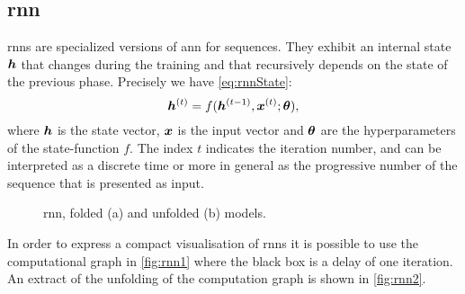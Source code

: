 \subsection{\acf{rnn}}
\acp{rnn} are specialized versions of \ac{ann} for sequences. They
exhibit an
internal state $\bm{h}$ that changes during the training and that
recursively depends on the state of the previous phase. Precisely we
have \cref{eq:rnnState}:
\begin{equation}\label{eq:rnnState}
  \bm{h}^{(t)} = f(\bm{h}^{(t-1)}, \bm{x}^{(t)}; \bm{\theta}),
\end{equation}
where $\bm{h}$ is the state vector, $\bm{x}$ is the input vector
and $\bm{\theta}$ are the hyperparameters of the state-function
$f$. The index $t$ indicates 
the iteration number, and can be interpreted as a discrete time or
more in general as the progressive number of the sequence that is
presented as
input.

\begin{figure}
  \centering
  \hfill
  \caption{\acf{rnn}, folded (a) and unfolded (b) models.}
  \label{fig:rnn}
\end{figure}
In order to express a compact visualisation of \acp{rnn} it is
possible to use the computational graph in \cref{fig:rnn1} where the
black box is a 
delay of one iteration. An extract of the unfolding of the computation
graph is 
shown in \cref{fig:rnn2}. 

